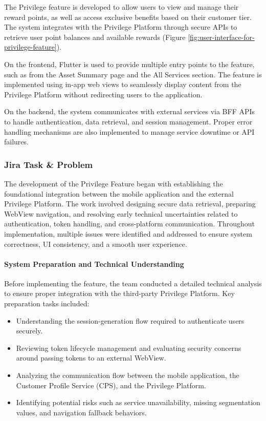 \documentclass[12pt,oneside,openright,a4paper]{cpe-english-project}
\begin{document}
The Privilege feature is developed to allow users to view and manage
their reward points, as well as access exclusive benefits based on their
customer tier. The system integrates with the Privilege Platform through
secure APIs to retrieve user point balances and available rewards (Figure \ref{fig:user-interface-for-privilege-feature}).

On the frontend, Flutter is used to provide multiple entry points to the
feature, such as from the Asset Summary page and the All Services
section. The feature is implemented using in-app web views to seamlessly
display content from the Privilege Platform without redirecting users to
the application.

On the backend, the system communicates with external services via BFF
APIs to handle authentication, data retrieval, and session management.
Proper error handling mechanisms are also implemented to manage service
downtime or API failures.

\subsubsection{Jira Task \& Problem}

The development of the Privilege Feature began with establishing the
foundational integration between the mobile application and the external
Privilege Platform. The work involved designing secure data retrieval,
preparing WebView navigation, and resolving early technical
uncertainties related to authentication, token handling, and
cross-platform communication. Throughout implementation, multiple issues
were identified and addressed to ensure system correctness, UI
consistency, and a smooth user experience.

\paragraph{System Preparation and Technical Understanding}

Before implementing the feature, the team conducted a detailed technical
analysis to ensure proper integration with the third-party Privilege
Platform. Key preparation tasks included:

\begin{itemize}
\item
  Understanding the session-generation flow required to authenticate
  users securely.
\item
  Reviewing token lifecycle management and evaluating security concerns
  around passing tokens to an external WebView.
\item
  Analyzing the communication flow between the mobile application, the
  Customer Profile Service (CPS), and the Privilege Platform.
\item
  Identifying potential risks such as service unavailability, missing
  segmentation values, and navigation fallback behaviors.
\end{itemize}
\end{document}
